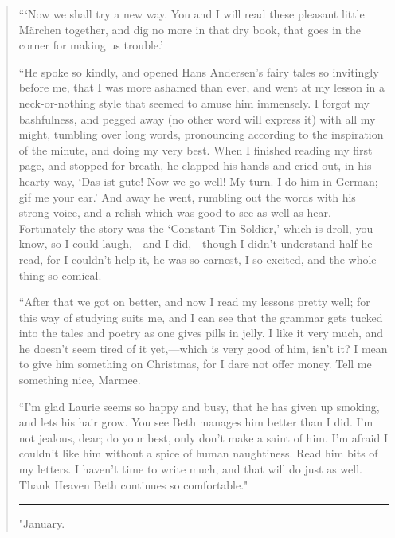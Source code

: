 \begin{quote}
```Now we shall try a new way. You and I will read these
pleasant little Märchen together, and dig no more in that dry book, that
goes in the corner for making us trouble.'

``He spoke so kindly, and opened Hans Andersen's fairy
tales so invitingly before me, that I was more ashamed than ever, and
went at my lesson in a neck-or-nothing style that seemed to amuse him
immensely. I forgot my bashfulness, and pegged away (no other word will
express it) with all my might, tumbling over long words, pronouncing
according to the inspiration of the minute, and doing my very best. When
I finished reading my first page, and stopped for breath, he clapped his
hands and cried out, in his hearty way, `Das ist gute!
Now we go well! My turn. I do him in German; gif me your
ear.' And away he went, rumbling out the words with his
strong voice, and a relish which was good to see as well as hear.
Fortunately the story was the `Constant Tin
Soldier,' which is droll, you know, so I could
laugh,---and I did,---though I didn't understand half he
read, for I couldn't help it, he was so earnest, I so
excited, and the whole thing so comical.

``After that we got on better, and now I read my lessons pretty well; for
this way of studying suits me, and I can see that the grammar gets
tucked into the tales and poetry as one gives pills in jelly. I like it
very much, and he doesn't seem tired of it yet,---which
is very good of him, isn't it? I mean to give him
something on Christmas, for I dare not offer money. Tell me something
nice, Marmee.

``I'm glad Laurie seems so happy and busy, that he has
given up smoking, and lets his hair grow. You see Beth manages him
better than I did. I'm not jealous, dear; do your best,
only don't make a saint of him. I'm
afraid I couldn't like him without a spice of human
naughtiness. Read him bits of my letters. I haven't time
to write much, and that will do just as well. Thank Heaven Beth
continues so comfortable."

\begin{center}\rule{0.5\linewidth}{0.5pt}\end{center}

"{January.}


\end{quote}
